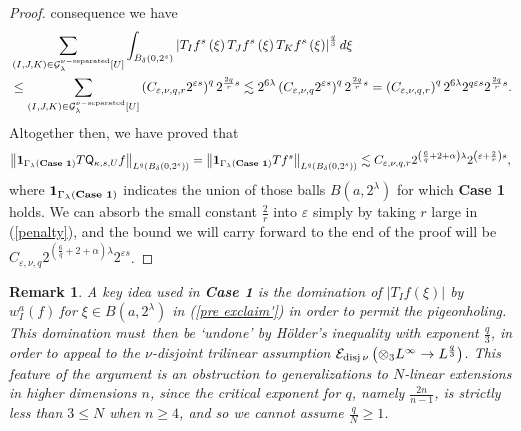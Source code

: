 \documentclass{amsart}%
\theoremstyle{plain}
\newtheorem{remark}[theorem]{Remark}
\numberwithin{equation}{section}
\begin{document}
\begin{proof}
consequence we have%
\begin{align*}
&  \sum_{\left(  I,J,K\right)  \in\mathcal{G}_{\lambda}^{\nu
-\mathop{\rm separated}}\left[  U\right]  }\int_{B_{\delta}\left(
0,2^{s}\right)  }\left\vert T_{I}f^{s}\left(  \xi\right)  T_{J}f^{s}\left(
\xi\right)  T_{K}f^{s}\left(  \xi\right)  \right\vert ^{\frac{q}{3}}d\xi\\
&  \leq\sum_{\left(  I,J,K\right)  \in\mathcal{G}_{\lambda}^{\nu
-\mathop{\rm separated}}\left[  U\right]  }\left(  C_{\varepsilon,\nu
,q,r}2^{\varepsilon s}\right)  ^{q}2^{\frac{2q}{r}s}\lesssim2^{6\lambda
}\left(  C_{\varepsilon,\nu,q}2^{\varepsilon s}\right)  ^{q}2^{\frac{2q}{r}%
s}=\left(  C_{\varepsilon,\nu,q,r}\right)  ^{q}2^{6\lambda}2^{q\varepsilon
s}2^{\frac{2q}{r}s}.
\end{align*}
Altogether then, we have proved that
\[
\left\Vert \mathbf{1}_{\Gamma_{\lambda}\left(  \text{\textbf{Case 1}}\right)
}T\mathsf{Q}_{\kappa,s,U}f\right\Vert _{L^{q}\left(  B_{\delta}\left(
0,2^{s}\right)  \right)  }=\left\Vert \mathbf{1}_{\Gamma_{\lambda}\left(
\text{\textbf{Case 1}}\right)  }Tf^{s}\right\Vert _{L^{q}\left(  B_{\delta
}\left(  0,2^{s}\right)  \right)  }\lesssim C_{\varepsilon,\nu,q,r}2^{\left(
\frac{6}{q}+2+\alpha\right)  \lambda}2^{\left(  \varepsilon+\frac{2}%
{r}\right)  s},
\]
where $\mathbf{1}_{\Gamma_{\lambda}\left(  \text{\textbf{Case 1}}\right)  }$
indicates the union of those balls $B\left(  a,2^{\lambda}\right)  $ for which
\textbf{Case 1} holds. We can absorb the small constant $\frac{2}{r}$ into
$\varepsilon$ simply by taking $r$ large in (\ref{penalty}), and the bound we
will carry forward to the end of the proof will be $C_{\varepsilon,\nu
,q}2^{\left(  \frac{6}{q}+2+\alpha\right)  \lambda}2^{\varepsilon s}$.
\end{proof}

\begin{remark}
A key idea used in \textbf{Case 1} is the domination of $\left\vert
T_{I}f\left(  \xi\right)  \right\vert $ by $w_{I}^{a}\left(  f\right)  \ $for
$\xi\in B\left(  a,2^{\lambda}\right)  $ in (\ref{pre exclaim'}) in order to
permit the pigeonholing. This domination must\ then be `undone' by
H\"{o}lder's inequality with exponent $\frac{q}{3}$, in order to appeal to the
$\nu$-disjoint trilinear assumption $\mathcal{E}_{\mathop{\rm disj}\nu}\left(
\otimes_{3}L^{\infty}\rightarrow L^{\frac{q}{3}}\right)  $. This feature of
the argument is an obstruction to generalizations to $N$-linear extensions in
higher dimensions $n$, since the critical exponent for $q$, namely $\frac
{2n}{n-1}$, is strictly less than $3\leq N$ when $n\geq4$, and so we cannot
assume $\frac{q}{N}\geq1$.
\end{remark}
\end{document}
